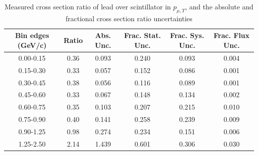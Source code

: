 \documentclass[../main.tex]{subfiles}
\begin{document}
\begin{table}
  \centering
  \renewcommand{\arraystretch}{1.15}
  \caption{Systematic covariance matrix of measured cross section ratio of lead over scintillator in $p_{\mu,||}$}
  \label{tbl:rationucleonnuc82muon_pzc}
\end{table}
\begin{table}
  \centering
  \renewcommand{\arraystretch}{1.15}
  \caption{Measured cross section ratio of lead over scintillator in $p_{\mu,T}$, and the absolute and fractional cross section ratio uncertainties}
    \begin{tabular}{c||c|c||c|c|c}
      Bin edges (GeV/c) &  Ratio  &  Abs. Unc.  &  Frac. Stat. Unc.  &  Frac. Sys. Unc.  &  Frac. Flux Unc. \\
      \hline
      \hline
      0.00-0.15 & 0.36 & 0.093 & 0.240 & 0.093 & 0.004\\
      0.15-0.30 & 0.33 & 0.057 & 0.152 & 0.086 & 0.001\\
      0.30-0.45 & 0.38 & 0.056 & 0.116 & 0.089 & 0.001\\
      0.45-0.60 & 0.33 & 0.067 & 0.148 & 0.134 & 0.002\\
      0.60-0.75 & 0.35 & 0.103 & 0.207 & 0.215 & 0.010\\
      0.75-0.90 & 0.40 & 0.141 & 0.258 & 0.239 & 0.009\\
      0.90-1.25 & 0.98 & 0.274 & 0.234 & 0.151 & 0.006\\
      1.25-2.50 & 2.14 & 1.439 & 0.601 & 0.306 & 0.030
    \end{tabular}
  \label{tbl:rationucleonnuc82muon_pta}
\end{table}
\end{document}
